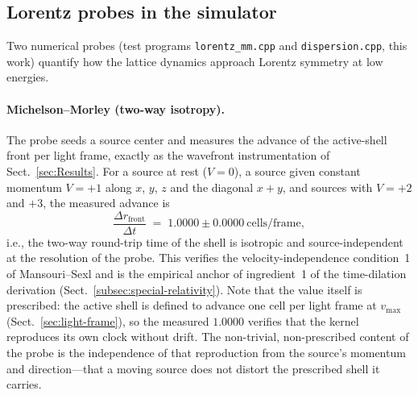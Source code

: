 \documentclass{ijuc}
\begin{document}
\subsection{Lorentz probes in the simulator}\label{subsec:lorentz-probes}
Two numerical probes (test programs \texttt{lorentz\_mm.cpp} and \texttt{dispersion.cpp}, this work) quantify how the lattice dynamics approach Lorentz symmetry at low energies.
\paragraph{Michelson--Morley (two-way isotropy).}  The probe seeds a source center and measures the advance of the active-shell front per light frame, exactly as the wavefront instrumentation of Sect.~\ref{sec:Results}.  For a source at rest ($V=0$), a source given constant momentum $V=+1$ along $x$, $y$, $z$ and the diagonal $x{+}y$, and sources with $V=+2$ and $+3$, the measured advance is
\begin{equation}
\frac{\Delta r_{\mathrm{front}}}{\Delta t} \;=\; 1.0000 \pm 0.0000 \ \mathrm{cells/frame},
\label{eq:mm-front}
\end{equation}
i.e., the two-way round-trip time of the shell is isotropic and source-independent at the resolution of the probe.  This verifies the velocity-independence condition~1 of Mansouri--Sexl \cite{mansouri-sexl} and is the empirical anchor of ingredient~1 of the time-dilation derivation (Sect.~\ref{subsec:special-relativity}).  Note that the value itself is prescribed: the active shell is defined to advance one cell per light frame at $v_{\max}$ (Sect.~\ref{sec:light-frame}), so the measured $1.0000$ verifies that the kernel reproduces its own clock without drift.  The non-trivial, non-prescribed content of the probe is the independence of that reproduction from the source's momentum and direction---that a moving source does not distort the prescribed shell it carries.
\end{document}
